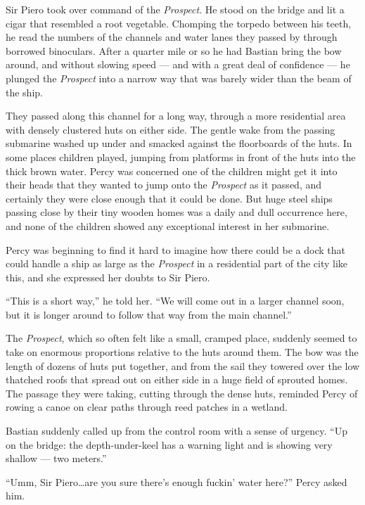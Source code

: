 \documentclass[
]{scrbook}
\begin{document}
Sir Piero took over command of the \emph{Prospect}. He stood on the
bridge and lit a cigar that resembled a root vegetable. Chomping the
torpedo between his teeth, he read the numbers of the channels and water
lanes they passed by through borrowed binoculars. After a quarter mile
or so he had Bastian bring the bow around, and without slowing speed ---
and with a great deal of confidence --- he plunged the \emph{Prospect}
into a narrow way that was barely wider than the beam of the ship.

They passed along this channel for a long way, through a more
residential area with densely clustered huts on either side. The gentle
wake from the passing submarine washed up under and smacked against the
floorboards of the huts. In some places children played, jumping from
platforms in front of the huts into the thick brown water. Percy was
concerned one of the children might get it into their heads that they
wanted to jump onto the \emph{Prospect} as it passed, and certainly they
were close enough that it could be done. But huge steel ships passing
close by their tiny wooden homes was a daily and dull occurrence here,
and none of the children showed any exceptional interest in her
submarine.

Percy was beginning to find it hard to imagine how there could be a dock
that could handle a ship as large as the \emph{Prospect} in a
residential part of the city like this, and she expressed her doubts to
Sir Piero.

``This is a short way,'' he told her. ``We will come out in a larger
channel soon, but it is longer around to follow that way from the main
channel.''

The \emph{Prospect}, which so often felt like a small, cramped place,
suddenly seemed to take on enormous proportions relative to the huts
around them. The bow was the length of dozens of huts put together, and
from the sail they towered over the low thatched roofs that spread out
on either side in a huge field of sprouted homes. The passage they were
taking, cutting through the dense huts, reminded Percy of rowing a canoe
on clear paths through reed patches in a wetland.

Bastian suddenly called up from the control room with a sense of
urgency. ``Up on the bridge: the depth-under-keel has a warning light
and is showing very shallow --- two meters.''

``Umm, Sir Piero\ldots are you sure there's enough fuckin' water here?''
Percy asked him.
\end{document}
